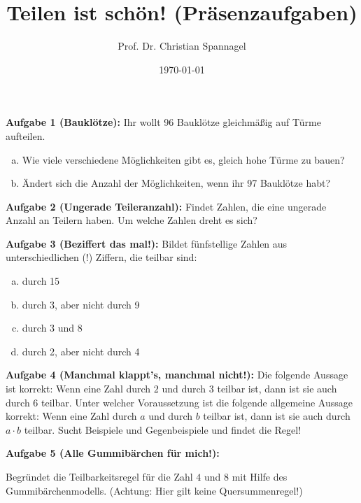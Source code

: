 \documentclass{../cssheet}
\title{Teilen ist schön! (Präsenzaufgaben)}
\author{Prof. Dr. Christian Spannagel}
\date{\today}
\begin{document}
\printtitle

\vspace*{10mm}

\textbf{Aufgabe 1 (Bauklötze):}  Ihr wollt 96 Bauklötze gleichmäßig auf Türme aufteilen.
\begin{enumerate}[a)]
	\item Wie viele verschiedene Möglichkeiten gibt es, gleich hohe Türme zu bauen?
	\item Ändert sich die Anzahl der Möglichkeiten, wenn ihr 97 Bauklötze habt?
\end{enumerate}

\textbf{Aufgabe 2 (Ungerade Teileranzahl):}  Findet Zahlen, die eine ungerade Anzahl an Teilern haben. Um welche Zahlen dreht es sich?

\textbf{Aufgabe 3 (Beziffert das mal!):}  Bildet fünfstellige Zahlen aus unterschiedlichen (!) Ziffern, die teilbar sind:
\begin{enumerate}[a)]
\item durch 15
\item durch 3, aber nicht durch 9
\item durch 3 und 8
\item durch 2, aber nicht durch 4
\end{enumerate}

\textbf{Aufgabe 4 (Manchmal klappt's, manchmal nicht!):} Die folgende Aussage ist korrekt: Wenn eine Zahl durch $2$ und durch $3$ teilbar ist, dann ist sie auch durch $6$ teilbar. Unter welcher Voraussetzung ist die folgende allgemeine Aussage korrekt: Wenn eine Zahl durch $a$ und durch $b$ teilbar ist, dann ist sie auch durch $a\cdot b$ teilbar.
Sucht Beispiele und Gegenbeispiele und findet die Regel!

\textbf{Aufgabe 5 (Alle Gummibärchen für mich!):}  

Begründet die Teilbarkeitsregel für die Zahl $4$ und $8$ mit Hilfe des Gummibärchenmodells. (Achtung: Hier gilt keine Quersummenregel!)


\vspace*{10mm}
\printlicense

\printsocials
\end{document}
